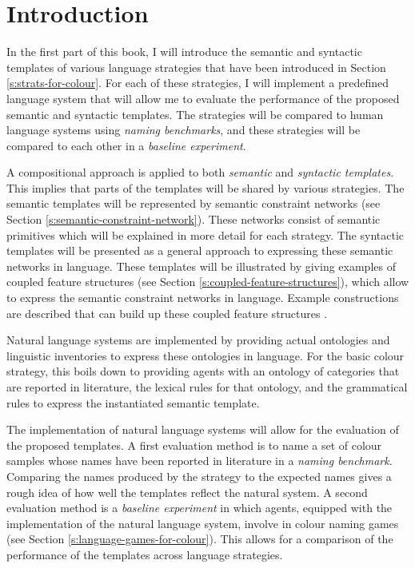 \section*{Introduction}

In the first part of this book, I will introduce the semantic and
syntactic templates of various language strategies that have been
introduced in Section \ref{s:strats-for-colour}. For each of these
strategies, I will implement a predefined language system that will
allow me to evaluate the performance of the proposed semantic and
syntactic templates. The strategies will be compared to human language
systems using \emph{naming benchmarks}, and these strategies will be
compared to each other in a \emph{baseline experiment}.

A compositional approach is applied to both
\emph{semantic} and \emph{syntactic
  templates}. This implies that parts of the
templates will be shared by various strategies. The semantic templates
will be represented by semantic constraint networks (see Section
\ref{s:semantic-constraint-network}). These networks consist of
semantic primitives which will be explained in more detail for each
strategy. The syntactic templates will be presented as a general
approach to expressing these semantic networks in language. These
templates will be illustrated by giving examples of coupled feature
structures (see Section \ref{s:coupled-feature-structures}), which
allow to express the semantic constraint networks in language. Example
constructions are described that can build up these coupled feature
structures \citep{bleys06next, steels07emergence, bleys08expressing}.

Natural language systems are implemented by providing actual
ontologies and linguistic inventories to express these ontologies in
language. For the basic colour strategy, this boils down to providing
agents with an ontology of categories that are reported in literature,
the lexical rules for that ontology, and the grammatical rules to
express the instantiated semantic template.

The implementation of natural language systems will allow for the
evaluation of the proposed templates. A first evaluation method is to
name a set of colour samples whose names have been reported in
literature in a \emph{naming benchmark}. 
Comparing the names produced by the strategy to the
expected names gives a rough idea of how well the templates reflect
the natural system. A second evaluation method is a \emph{baseline
  experiment} in which agents, equipped
with the implementation of the natural language system, involve in
colour naming games (see Section
\ref{s:language-games-for-colour}). This allows for a comparison of
the performance of the templates across language strategies.

\newpage
\thispagestyle{empty}

